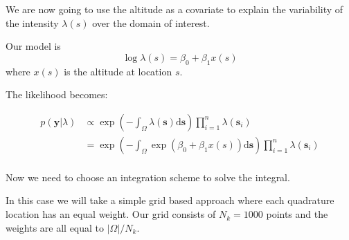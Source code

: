 \documentclass[
  letterpaper,
  DIV=11,
  numbers=noendperiod]{scrartcl}
\newenvironment{Shaded}{\begin{snugshade}}{\end{snugshade}}
\newcommand{\AttributeTok}[1]{\textcolor[rgb]{0.40,0.45,0.13}{#1}}
\newcommand{\CommentTok}[1]{\textcolor[rgb]{0.37,0.37,0.37}{#1}}
\newcommand{\DecValTok}[1]{\textcolor[rgb]{0.68,0.00,0.00}{#1}}
\newcommand{\FunctionTok}[1]{\textcolor[rgb]{0.28,0.35,0.67}{#1}}
\newcommand{\NormalTok}[1]{\textcolor[rgb]{0.00,0.23,0.31}{#1}}
\newcommand{\OtherTok}[1]{\textcolor[rgb]{0.00,0.23,0.31}{#1}}
\newcommand{\SpecialCharTok}[1]{\textcolor[rgb]{0.37,0.37,0.37}{#1}}
\newcommand{\StringTok}[1]{\textcolor[rgb]{0.13,0.47,0.30}{#1}}
\begin{document}
We are now going to use the altitude as a covariate to explain the
variability of the intensity \(\lambda(s)\) over the domain of interest.

Our model is \[
\log\lambda(s) = \beta_0 + \beta_1x(s)
\] where \(x(s)\) is the altitude at location \(s\).

The likelihood becomes:

\[
\begin{aligned}
p(\mathbf{y} | \lambda)  & \propto \exp \left( -\int_\Omega \lambda(\mathbf{s}) \mathrm{d}\mathbf{s} \right) \prod_{i=1}^n \lambda(\mathbf{s}_i) \\
& = \exp \left( -\int_\Omega \exp(\beta_0 + \beta_1x(s)) \mathrm{d}\mathbf{s} \right) \prod_{i=1}^n \lambda(\mathbf{s}_i) \\
\end{aligned}
\]

Now we need to choose an integration scheme to solve the integral.

In this case we will take a simple grid based approach where each
quadrature location has an equal weight. Our grid consists of
\(N_k = 1000\) points and the weights are all equal to \(|\Omega|/N_k\).

\begin{Shaded}
\end{Shaded}
\end{document}
